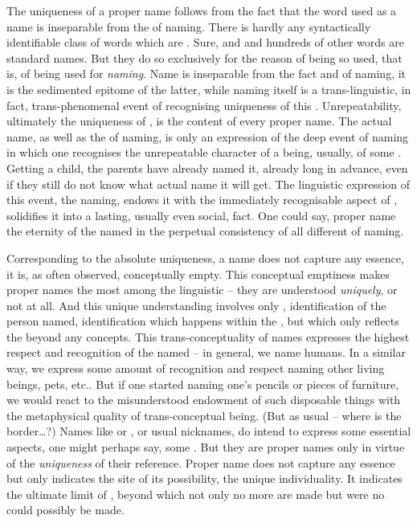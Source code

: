 The uniqueness of a proper name follows from the fact that the word used as a
name is inseparable from the  of naming. There is hardly any
syntactically identifiable class of words which are .
Sure,  and  and hundreds of other words are standard names.
But they do so exclusively for the reason of being so used, that is, of being
used for {\em naming}. Name is inseparable from the fact and  of naming,
it is the sedimented epitome of the latter, while naming itself is a
trans-linguistic, in fact, trans-phenomenal event of recognising uniqueness of
this . Unrepeatability, ultimately the uniqueness of
, is the  content of every proper name.  The actual
name, as well as the  of 
naming, is only an expression of the deep event of naming in which one
recognises the unrepeatable character of a being, usually, of some
. Getting a child, the parents have already named it, already long
in advance, even if they still do not know what actual name it will get. The
linguistic expression of this event, the  naming, 
endows it with the immediately recognisable aspect of ,
solidifies it into a lasting, usually even social, fact. One could say, proper
name  the eternity of the named  in the perpetual
consistency of all different  of naming. 

\pa
Corresponding to the absolute uniqueness, a name does not capture any
essence, it is, as often observed, conceptually empty.
%
%
This conceptual emptiness makes proper names the most  among the
linguistic  -- they are understood {\em uniquely}, or not at all. And
this unique understanding involves only , identification of the person
named, identification which happens within the \hoa, but which only reflects the
 beyond any concepts.  This trans-conceptuality of names expresses the
highest respect and recognition of the named -- in general, we name humans. In a
similar way, we express some amount of recognition and respect naming other
living beings, pets, etc.. But if one started naming one's pencils or pieces of
furniture, we would react to the misunderstood endowment of such disposable
things with the metaphysical quality of trans-conceptual being. (But as usual --
where is the border\ldots?)  Names like  or , or
usual {nicknames}, do intend to express some essential aspects, one might
perhaps say, some . But they are proper names only in
virtue of the {\em uniqueness} of their reference.  Proper name does not capture
any essence but only indicates the site of its possibility, the unique
individuality.  It indicates the ultimate limit of , beyond
which not only no more  are made but were no 
could possibly be made.


